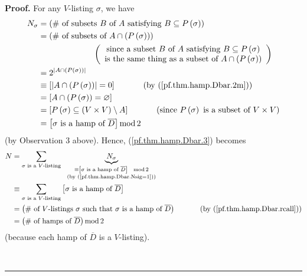 \documentclass[numbers=enddot,12pt,final,onecolumn,notitlepage]{scrartcl}%
\numberwithin{exer}{subsection}
\theoremstyle{definition}
\newenvironment{proof}[1][Proof]{\noindent\textbf{#1.} }{\ \rule{0.5em}{0.5em}}
\let\sumnonlimits\sum
\renewcommand{\sum}{\sumnonlimits\limits}
\begin{document}
\begin{proof}
For any $V$-listing $\sigma$, we have%
\begin{align}
N_{\sigma}  &  =\left(  \#\text{ of subsets }B\text{ of }A\text{ satisfying
}B\subseteq P\left(  \sigma\right)  \right) \nonumber\\
&  =\left(  \#\text{ of subsets of }A\cap\left(  P\left(  \sigma\right)
\right)  \right) \nonumber\\
&  \ \ \ \ \ \ \ \ \ \ \ \ \ \ \ \ \ \ \ \ \left(
\begin{array}
[c]{c}%
\text{since a subset }B\text{ of }A\text{ satisfying }B\subseteq P\left(
\sigma\right) \\
\text{is the same thing as a subset of }A\cap\left(  P\left(  \sigma\right)
\right)
\end{array}
\right) \nonumber\\
&  =2^{\left\vert A\cap\left(  P\left(  \sigma\right)  \right)  \right\vert
}\nonumber\\
&  \equiv\left[  \left\vert A\cap\left(  P\left(  \sigma\right)  \right)
\right\vert =0\right]  \ \ \ \ \ \ \ \ \ \ \left(  \text{by
(\ref{pf.thm.hamp.Dbar.2m})}\right) \nonumber\\
&  =\left[  A\cap\left(  P\left(  \sigma\right)  \right)  =\varnothing\right]
\nonumber\\
&  =\left[  P\left(  \sigma\right)  \subseteq\left(  V\times V\right)
\setminus A\right]  \ \ \ \ \ \ \ \ \ \ \left(  \text{since }P\left(
\sigma\right)  \text{ is a subset of }V\times V\right) \nonumber\\
&  =\left[  \sigma\text{ is a hamp of }\overline{D}\right]  \operatorname{mod}%
2 \label{pf.thm.hamp.Dbar.Nsig=1}%
\end{align}
(by Observation 3 above). Hence, (\ref{pf.thm.hamp.Dbar.3}) becomes%
\begin{align}
N  &  =\sum_{\sigma\text{ is a }V\text{-listing}}\ \ \underbrace{N_{\sigma}%
}_{\substack{\equiv\left[  \sigma\text{ is a hamp of }\overline{D}\right]
\ \ \operatorname{mod}2\\\text{(by (\ref{pf.thm.hamp.Dbar.Nsig=1}))}%
}}\nonumber\\
&  \equiv\sum_{\sigma\text{ is a }V\text{-listing}}\left[  \sigma\text{ is a
hamp of }\overline{D}\right] \nonumber\\
&  =\left(  \#\text{ of }V\text{-listings }\sigma\text{ such that }%
\sigma\text{ is a hamp of }\overline{D}\right)  \ \ \ \ \ \ \ \ \ \ \left(
\text{by (\ref{pf.thm.hamp.Dbar.rcall})}\right) \nonumber\\
&  =\left(  \#\text{ of hamps of }\overline{D}\right)  \operatorname{mod}2
\label{pf.thm.hamp.Dbr.5}%
\end{align}
(because each hamp of $\overline{D}$ is a $V$-listing).


\end{proof}
\end{document}
